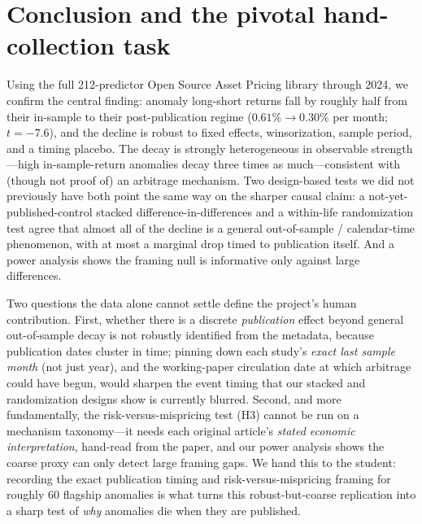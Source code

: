 \documentclass[12pt]{article}
\begin{document}
\section{Conclusion and the pivotal hand-collection task}\label{sec:tasks}
Using the full 212-predictor Open Source Asset Pricing library through 2024, we confirm the
central \citet{mcleanpontiff2016} finding: anomaly long-short returns fall by roughly half from
their in-sample to their post-publication regime ($0.61\%\!\to\!0.30\%$ per month; $t=-7.6$),
and the decline is robust to fixed effects, winsorization, sample period, and a timing placebo.
The decay is strongly heterogeneous in observable strength---high in-sample-return anomalies
decay three times as much---consistent with (though not proof of) an arbitrage mechanism.
Two design-based tests we did not previously have both point the same way on the sharper causal
claim: a not-yet-published-control stacked difference-in-differences and a within-life
randomization test agree that almost all of the decline is a general out-of-sample /
calendar-time phenomenon, with at most a marginal drop timed to publication itself. And a power
analysis shows the framing null is informative only against large differences.

Two questions the data alone cannot settle define the project's human contribution. First,
whether there is a discrete \emph{publication} effect beyond general out-of-sample decay is not
robustly identified from the metadata, because publication dates cluster in time; pinning down
each study's \emph{exact last sample month} (not just year), and the working-paper circulation
date at which arbitrage could have begun, would sharpen the event timing that our stacked and
randomization designs show is currently blurred. Second, and more fundamentally, the
risk-versus-mispricing test (H3) cannot be run on a mechanism taxonomy---it needs each original
article's \emph{stated economic interpretation}, hand-read from the paper, and our power
analysis shows the coarse proxy can only detect large framing gaps. We hand this to the student:
recording the exact publication timing and risk-versus-mispricing framing for roughly 60
flagship anomalies is what turns this robust-but-coarse replication into a sharp test of
\emph{why} anomalies die when they are published.
\end{document}
